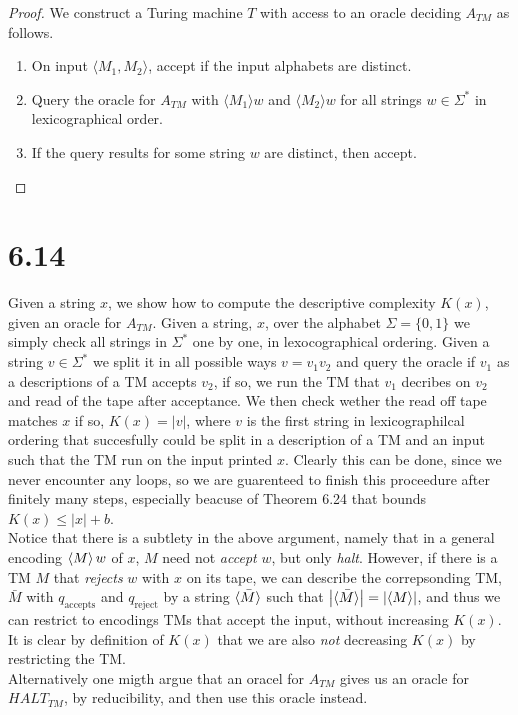 \documentclass[a4paper,11pt]{article}
\newcommand{\abs}[1]{\left\lvert #1 \right\rvert}
\numberwithin{equation}{section}
\begin{document}
\begin{proof}
    We construct a Turing machine $T$ with access to an oracle deciding $A_{TM}$ as follows.
    \begin{enumerate}[label=\arabic*)]
        \item On input $\langle M_1,M_2\rangle$, accept if the input alphabets are distinct. 
        
        \item Query the oracle for $A_{TM}$ with $\langle M_1\rangle w$ and $\langle M_2\rangle w$ for all strings $w\in\Sigma^*$ in lexicographical order.
        \item If the query results for some string $w$ are distinct, then accept. 
    \end{enumerate}
\end{proof}

\section*{6.14}
Given a string $ x $, we show how to compute the descriptive complexity $ K(x) $, given an oracle for $ A_{TM} $. Given a string, $ x $, over the alphabet $ \Sigma=\{0,1\} $ we simply check all strings in $ \Sigma^* $ one by one, in lexocographical ordering. Given a string $ v\in\Sigma^* $ we split it in all possible ways $ v=v_1v_2 $ and query the oracle if $ v_1 $ as a descriptions of a TM accepts $ v_2 $, if so, we run the TM that $ v_1 $ decribes on $ v_2 $ and read of the tape after acceptance. We then check wether the read off tape matches $ x $ if so, $ K(x)=\abs{v} $, where $ v $ is the first string in lexicographilcal ordering that succesfully could be split in a description of a TM and an input such that the TM run on the input printed $ x $. Clearly this can be done, since we never encounter any loops, so we are guarenteed to finish this proceedure after finitely many steps, especially beacuse of Theorem 6.24 that bounds $ K(x)\leq \abs{x}+b $.
\\
Notice that there is a subtlety in the above argument, namely that in a general encoding $ \braket{M}w $ of $ x $, $ M $ need not \emph{accept} $ w $, but only \emph{halt}. However, if there is a TM $ M $ that \emph{rejects} $ w $ with $ x $ on its tape, we can describe the correpsonding TM, $ \bar{M} $ with $ q_{\text{accepts}} $ and $ q_{\text{reject}} $ by a string $ \braket{\bar{M}} $ such that $ \abs{\braket{\bar{M}}}=\abs{\braket{M}} $, and thus we can restrict to encodings TMs that accept the input, without increasing $ K(x) $. It is clear by definition of $ K(x) $ that we are also \emph{not} decreasing $ K(x) $ by restricting the TM. \\
Alternatively one migth argue that an oracel for $ A_{TM} $ gives us an oracle for $ HALT_{TM} $, by reducibility, and then use this oracle instead.
\end{document}
